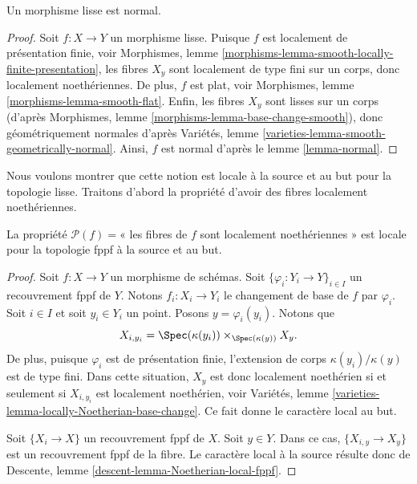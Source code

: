 \begin{lemma}
\label{lemma-smooth-normal}
Un morphisme lisse est normal.
\end{lemma}

\begin{proof}
Soit $f : X \to Y$ un morphisme lisse.
Puisque $f$ est localement de présentation finie, voir
Morphismes, lemme \ref{morphisms-lemma-smooth-locally-finite-presentation},
les fibres $X_y$ sont localement de type fini sur un corps, donc
localement noethériennes. De plus, $f$ est plat, voir
Morphismes, lemme \ref{morphisms-lemma-smooth-flat}.
Enfin, les fibres $X_y$ sont lisses sur un corps (d'après
Morphismes, lemme \ref{morphisms-lemma-base-change-smooth}),
donc géométriquement normales d'après
Variétés, lemme \ref{varieties-lemma-smooth-geometrically-normal}.
Ainsi, $f$ est normal d'après le
lemme \ref{lemma-normal}.
\end{proof}

\noindent
Nous voulons montrer que cette notion est locale à la source et au but
pour la topologie lisse. Traitons d'abord la propriété d'avoir des
fibres localement noethériennes.

\begin{lemma}
\label{lemma-locally-Noetherian-fibres-fppf-local-source-and-target}
La propriété $\mathcal{P}(f)=$« les fibres de $f$ sont localement noethériennes »
est locale pour la topologie fppf à la source et au but.
\end{lemma}

\begin{proof}
Soit $f : X \to Y$ un morphisme de schémas.
Soit $\{\varphi_i : Y_i \to Y\}_{i \in I}$ un recouvrement fppf de $Y$.
Notons $f_i : X_i \to Y_i$ le changement de base de $f$ par $\varphi_i$.
Soit $i \in I$ et soit $y_i \in Y_i$ un point.
Posons $y = \varphi_i(y_i)$. Notons que
$$
X_{i, y_i} = \Spec(\kappa(y_i)) \times_{\Spec(\kappa(y))} X_y.
$$
De plus, puisque $\varphi_i$ est de présentation finie, l'extension de corps
$\kappa(y_i)/\kappa(y)$ est de type fini.
Dans cette situation, $X_y$ est donc localement noethérien si et
seulement si $X_{i, y_i}$ est localement noethérien, voir
Variétés, lemme \ref{varieties-lemma-locally-Noetherian-base-change}.
Ce fait donne le caractère local au but.

\medskip\noindent
Soit $\{X_i \to X\}$ un recouvrement fppf de $X$.
Soit $y \in Y$. Dans ce cas, $\{X_{i, y} \to X_y\}$ est un
recouvrement fppf de la fibre. Le caractère local à la source
résulte donc de Descente, lemme \ref{descent-lemma-Noetherian-local-fppf}.
\end{proof}

